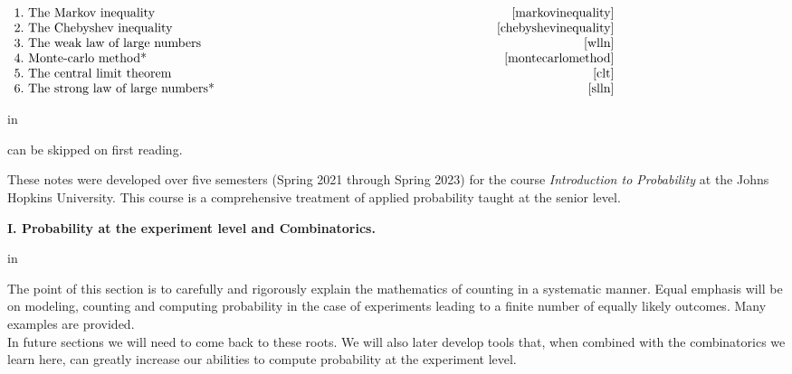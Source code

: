 \documentclass[12pt]{article}
\begin{document}
\bigskip


$
\begin{array}{lr}
1.\mbox{ The Markov inequality} \hskip 3.6 in & \pageref{markovinequality}\\
2.\mbox{ The Chebyshev inequality} & \pageref{chebyshevinequality}\\
3.\mbox{ The weak law of large numbers} & \pageref{wlln}\\
4.\mbox{ Monte-carlo method*} & \pageref{montecarlomethod}\\
5.\mbox{ The central limit theorem} & \pageref{clt}\\
6.\mbox{ The strong law of large numbers*} & \pageref{slln}\\
\end{array}
$

 in

\noindent * can be skipped on first reading.

\newpage

\noindent These notes were developed over five semesters (Spring 2021 through Spring 2023)
for the course {\em Introduction to Probability} at the Johns Hopkins University.
This course is a comprehensive treatment of applied probability taught at the senior level.


\newpage

\begin{center}{\bf \Large I. Probability at the experiment level and Combinatorics.}\end{center}

 in

\noindent The point of this section is to carefully and rigorously explain
the mathematics of counting in a systematic manner.
Equal emphasis will be on modeling, counting and
computing probability in the case of experiments
leading to a finite number of
equally likely outcomes.  Many examples are provided.\\

\noindent In future sections we will need to come back to these roots. We will also later
develop tools that, when combined with the combinatorics we learn here, can greatly increase our
abilities to compute probability at the experiment level.




\newpage




\end{document}
